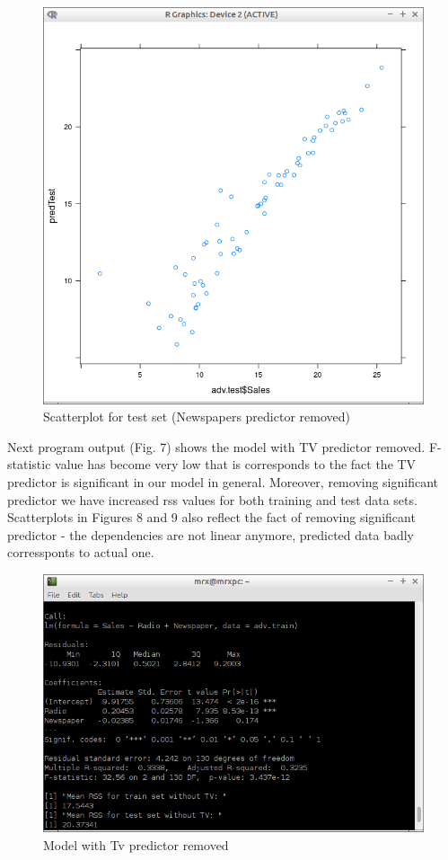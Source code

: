 \documentclass[10pt,a4paper]{article}
\begin{document}
\begin{figure}[H]
\centering
\includegraphics[width=140mm]{figures/pltNoNewsTest.png}
\caption{Scatterplot for test set (Newspapers predictor removed) \label{overflow}}
\end{figure}
\vspace{5cm}

Next program output (Fig. 7) shows the model with TV predictor removed. F-statistic value has become very low that is corresponds to the fact the TV predictor is significant in our model in general. Moreover, removing significant predictor we have increased rss values for both training and test data sets.\\
Scatterplots in Figures 8 and 9 also reflect the fact of removing significant predictor - the dependencies are not linear anymore, predicted data badly corressponts to actual one.

\begin{figure}[H]
\centering
\includegraphics[width=140mm]{figures/noTv.png}
\caption{Model with Tv predictor removed \label{overflow}}
\end{figure}
\end{document}
